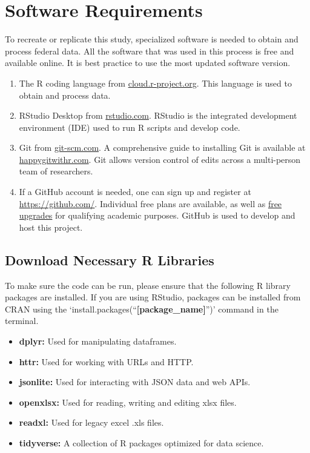 \documentclass[
]{book}
\providecommand{\tightlist}{%
  \setlength{\itemsep}{0pt}\setlength{\parskip}{0pt}}
\begin{document}
\hypertarget{software}{%
\chapter{Software Requirements}\label{software}}

To recreate or replicate this study, specialized software is needed to obtain and process federal data. All the software that was used in this process is free and available online. It is best practice to use the most updated software version.

\begin{enumerate}
\def\labelenumi{\arabic{enumi}.}
\tightlist
\item
  The R coding language from \href{https://cloud.r-project.org/}{cloud.r-project.org}. This language is used to obtain and process data.
\item
  RStudio Desktop from \href{https://rstudio.com/products/rstudio/download/\#download}{rstudio.com}. RStudio is the integrated development environment (IDE) used to run R scripts and develop code.
\item
  Git from \href{https://git-scm.com/downloads}{git-scm.com}. A comprehensive guide to installing Git is available at \href{https://happygitwithr.com/install-git.html}{happygitwithr.com}. Git allows version control of edits across a multi-person team of researchers.
\item
  If a GitHub account is needed, one can sign up and register at \url{https://github.com/}. Individual free plans are available, as well as \href{https://help.github.com/en/articles/applying-for-an-educator-or-researcher-discount}{free upgrades} for qualifying academic purposes. GitHub is used to develop and host this project.
\end{enumerate}

\hypertarget{libraries}{%
\section{Download Necessary R Libraries}\label{libraries}}

To make sure the code can be run, please ensure that the following R library packages are installed. If you are using RStudio, packages can be installed from CRAN using the `install.packages(``\textbf{{[}package\_name{]}}'')' command in the terminal.

\begin{itemize}
\tightlist
\item
  \textbf{dplyr:} Used for manipulating dataframes. \citep{dplyr1}
\item
  \textbf{httr:} Used for working with URLs and HTTP. \citep{httr2}
\item
  \textbf{jsonlite:} Used for interacting with JSON data and web APIs. \citep{json3}
\item
  \textbf{openxlsx:} Used for reading, writing and editing xlsx files. \citep{openxlsx4}
\item
  \textbf{readxl:} Used for legacy excel .xls files. \citep{readxl5}
\item
  \textbf{tidyverse:} A collection of R packages optimized for data science. \citep{tidyverse6}
\end{itemize}
\end{document}
